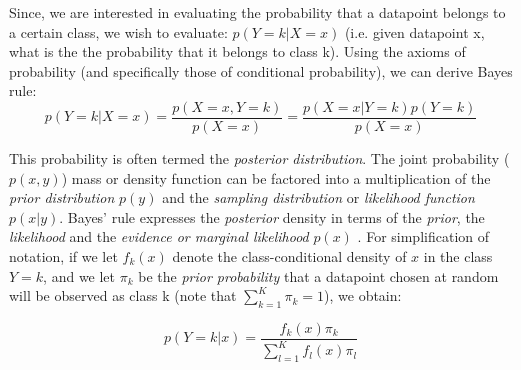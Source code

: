\documentclass{article}
\begin{document}
Since, we are interested in evaluating the probability that a datapoint belongs to a certain class, we wish to evaluate: $p(Y=k \vert X = x)$ (i.e. given datapoint x, what is the the probability that it belongs to class k). Using the axioms of probability (and specifically those of conditional probability), we can derive Bayes rule:
$$
p(Y=k|X=x) = \frac{p(X=x, Y=k)}{p(X=x)} = \frac{p(X=x|Y=k)p(Y=k)}{p(X=x)}
$$

This probability is often termed the \textit{posterior distribution}. The joint probability ($p(x, y)$) mass or density function can be factored into a multiplication of the \textit{prior distribution} $p(y)$ and the \textit{sampling distribution} or \textit{likelihood function} $p(x \vert y)$. Bayes' rule expresses the \textit{posterior} density in terms of the \textit{prior}, the \textit{likelihood} and the \textit{evidence or marginal likelihood} $p(x)$ \cite{gelman2013philosophy} \cite{gelman2014bayesian}. For simplification of notation, if we let $f_k(x)$ denote the class-conditional density of $x$ in the class $Y=k$, and we let $\pi_k$ be the \textit{prior probability} that a datapoint chosen at random will be observed as class k (note that $\sum_{k=1}^K \pi_k = 1$), we obtain:

$$
p(Y=k|x) = \frac{f_k(x) \pi_k}{\sum_{l=1}^K f_l(x) \pi_l}
$$



\end{document}
